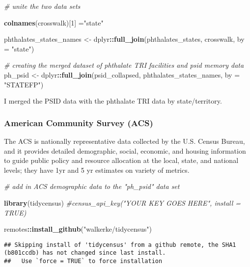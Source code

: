 \documentclass[
]{article}
\newenvironment{Shaded}{\begin{snugshade}}{\end{snugshade}}
\newcommand{\AttributeTok}[1]{\textcolor[rgb]{0.13,0.29,0.53}{#1}}
\newcommand{\CommentTok}[1]{\textcolor[rgb]{0.56,0.35,0.01}{\textit{#1}}}
\newcommand{\DecValTok}[1]{\textcolor[rgb]{0.00,0.00,0.81}{#1}}
\newcommand{\FunctionTok}[1]{\textcolor[rgb]{0.13,0.29,0.53}{\textbf{#1}}}
\newcommand{\NormalTok}[1]{#1}
\newcommand{\OtherTok}[1]{\textcolor[rgb]{0.56,0.35,0.01}{#1}}
\newcommand{\SpecialCharTok}[1]{\textcolor[rgb]{0.81,0.36,0.00}{\textbf{#1}}}
\newcommand{\StringTok}[1]{\textcolor[rgb]{0.31,0.60,0.02}{#1}}
\begin{document}
\begin{Shaded}
\begin{Highlighting}[]
\CommentTok{\# unite the two data sets}

\FunctionTok{colnames}\NormalTok{(crosswalk)[}\DecValTok{1}\NormalTok{] }\OtherTok{=}\StringTok{"state"}

\NormalTok{phthalates\_states\_names }\OtherTok{\textless{}{-}}\NormalTok{ dplyr}\SpecialCharTok{::}\FunctionTok{full\_join}\NormalTok{(phthalates\_states, crosswalk, }\AttributeTok{by =} \StringTok{"state"}\NormalTok{)}

\CommentTok{\# creating the merged dataset of phthalate TRI facilities and psid memory data}
\NormalTok{ph\_psid }\OtherTok{\textless{}{-}}\NormalTok{ dplyr}\SpecialCharTok{::}\FunctionTok{full\_join}\NormalTok{(psid\_collapsed, phthalates\_states\_names, }\AttributeTok{by =} \StringTok{"STATEFP"}\NormalTok{)}
\end{Highlighting}
\end{Shaded}

I merged the PSID data with the phthalate TRI data by state/territory.

\hypertarget{american-community-survey-acs}{%
\subsubsection{American Community Survey
(ACS)}\label{american-community-survey-acs}}

The ACS is nationally representative data collected by the U.S. Census
Bureau, and it provides detailed demographic, social, economic, and
housing information to guide public policy and resource allocation at
the local, state, and national levels; they have 1yr and 5 yr estimates
on variety of metrics.

\begin{Shaded}
\begin{Highlighting}[]
\CommentTok{\# add in ACS demographic data to the "ph\_psid" data set}

\FunctionTok{library}\NormalTok{(tidycensus)}
\CommentTok{\#census\_api\_key("YOUR KEY GOES HERE", install = TRUE)}

\NormalTok{remotes}\SpecialCharTok{::}\FunctionTok{install\_github}\NormalTok{(}\StringTok{"walkerke/tidycensus"}\NormalTok{)}
\end{Highlighting}
\end{Shaded}

\begin{verbatim}
## Skipping install of 'tidycensus' from a github remote, the SHA1 (b801ccdb) has not changed since last install.
##   Use `force = TRUE` to force installation
\end{verbatim}
\end{document}
